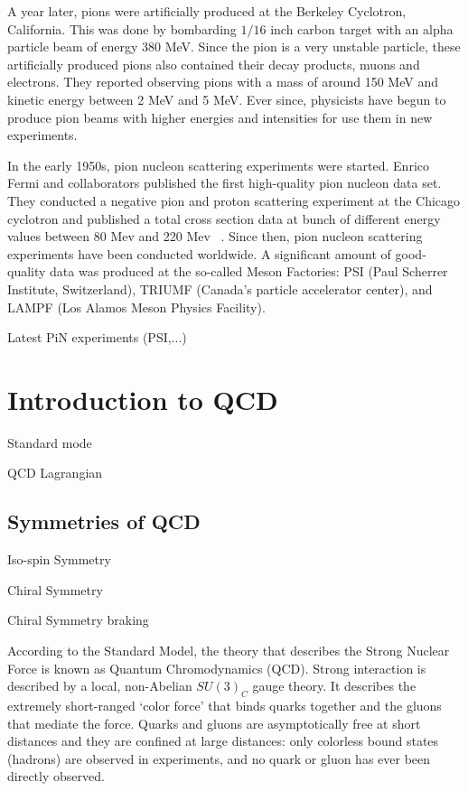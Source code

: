 A year later, pions were artificially produced at the Berkeley Cyclotron, California\cite{FirstPionsBerkeley}. This was done by bombarding $1/16$ inch carbon target with an alpha particle beam of energy 380 MeV. Since the pion is a very unstable particle, these artificially produced pions also contained their decay products, muons and electrons. They reported observing pions with a mass of around 150 MeV and kinetic energy between 2 MeV and 5 MeV. Ever since, physicists have begun to produce pion beams with higher energies and intensities for use them in new experiments.


In the early 1950s, pion nucleon scattering experiments were started. Enrico Fermi and collaborators published the first high-quality pion nucleon data set. They conducted a negative pion and proton scattering experiment at the Chicago cyclotron and published a total cross section data at bunch of different energy values between 80 Mev and 220 Mev  \cite{PiNScatteringFermi1952}. Since then, pion nucleon scattering experiments have been conducted worldwide. A significant amount of good-quality data was produced at the so-called Meson Factories: PSI (Paul Scherrer Institute, Switzerland), TRIUMF (Canada's particle accelerator center), and LAMPF (Los Alamos Meson Physics Facility).

{\orange Latest PiN experiments (PSI,...)}


\section{Introduction to QCD}

{\orange Standard mode}

{\orange QCD Lagrangian}

\subsection{Symmetries of QCD}

{\orange Iso-spin Symmetry}

{\orange Chiral Symmetry}

{\orange Chiral Symmetry braking}


According to the Standard Model, the theory that describes the Strong Nuclear Force is known as Quantum Chromodynamics (QCD). Strong interaction is described by a local, non-Abelian $SU(3)_C$ gauge theory. It describes the extremely short-ranged ‘color force’ that binds quarks together and the gluons that mediate the force. Quarks and gluons are asymptotically free at short distances and they are confined at large distances: only colorless bound states (hadrons) are observed in experiments, and no quark or gluon has ever been directly observed.

